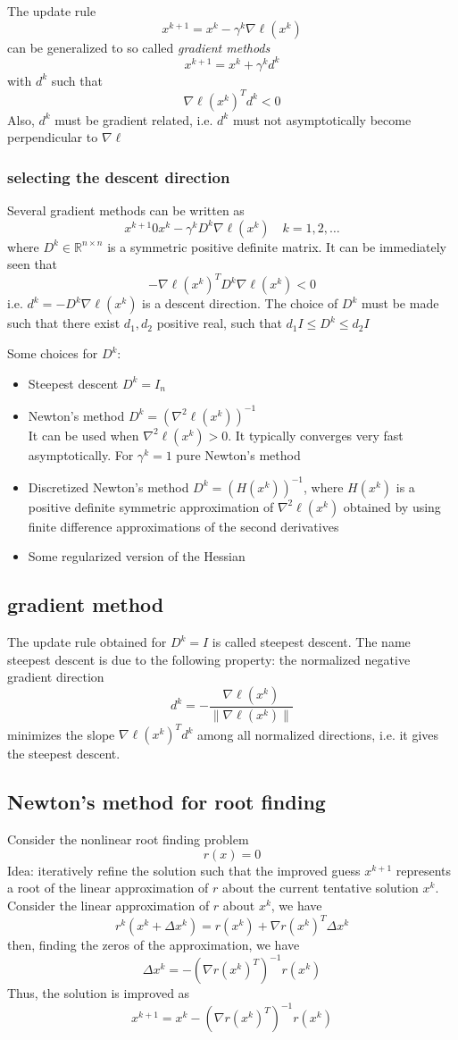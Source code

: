 \documentclass{book}
\newcommand{\R}{\mathbb{R}}
\theoremstyle{definition}
\theoremstyle{remark}
\theoremstyle{remark}
\begin{document}
The update rule 
\[
    x^{k+1}=x^k-\gamma^k\nabla\ell(x^k)
\]
can be generalized to so called \emph{gradient methods}
\[
    x^{k+1}=x^k+\gamma^kd^k
\]
with $d^k$ such that
\[
    \nabla\ell(x^k)^Td^k<0
\]
Also, $d^k$ must be gradient related, i.e. $d^k$ must not asymptotically become perpendicular to $\nabla\ell$
\subsubsection{selecting the descent direction}
Several gradient methods can be written as 
\[
    x^{k+1} 0 x^k-\gamma^kD^k\nabla\ell(x^k) \quad k=1,2,\dots
\]
where $D^k\in\R^{n\times n}$ is  a symmetric positive definite matrix. It can be immediately seen that 
\[
    -\nabla\ell(x^k)^TD^k\nabla\ell(x^k)<0
\]
i.e. $d^k = -D^k\nabla\ell(x^k)$ is a descent direction. The choice of $D^k$ must be made such that there exist $d_1,d_2$ positive real, such that $d_1 I \leq D^k \leq d_2 I$

Some choices for $D^k$:
\begin{itemize}
    \item Steepest descent $D^k=I_n$
    \item Newton's method $D^k = (\nabla^2\ell(x^k))^{-1}$\\
        It can be used when $\nabla^2\ell(x^k)>0$. It typically converges very fast asymptotically. For $\gamma^k = 1$ pure Newton's method
    \item Discretized Newton's method $D^k=(H(x^k))^{-1}$, where $H(x^k)$ is a positive definite symmetric approximation of $\nabla^2\ell(x^k)$ obtained by using finite difference approximations of the second derivatives 
    \item Some regularized version of the Hessian
\end{itemize}
\subsection{gradient method}
The update rule obtained for $D^k=I$ is called steepest descent. The name steepest descent is due to the following property: the normalized negative gradient direction 
\[
    d^k = -\displaystyle\frac{\nabla\ell(x^k)}{\|\nabla\ell(x^k)\|}
\]
minimizes the slope $\nabla \ell(x^k)^Td^k$ among all normalized directions, i.e. it gives the steepest descent.

\subsection{Newton's method for root finding}
Consider the nonlinear root finding problem 
\[
    r(x) = 0
\]
Idea: iteratively refine the solution such that the improved guess $x^{k+1}$ represents a root of the linear approximation of $r$ about the current tentative solution $x^k$. Consider the linear approximation of $r$ about $x^k$, we have 
\[
    r^k(x^k+\Delta x^k) = r(x^k)+\nabla r(x^k)^T\Delta x^k
\]
then, finding the zeros of the approximation, we have
\[
    \Delta x^k = -(\nabla r(x^k)^T)^{-1}r(x^k)
\]
Thus, the solution is improved as 
\[
    x^{k+1} = x^k-(\nabla r(x^k)^T)^{-1}r(x^k)
\]
\end{document}
